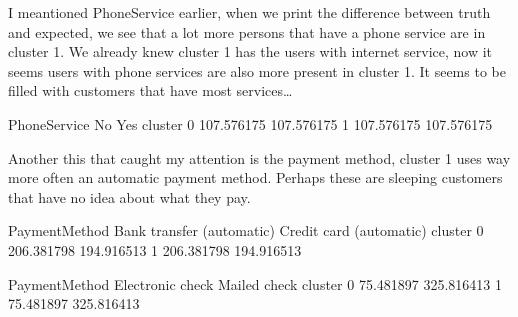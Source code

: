 \documentclass[letterpaper,10pt,english]{jupyterBook}
\begin{document}
\sphinxAtStartPar
I meantioned PhoneService earlier, when we print the difference between truth and expected, we see that a lot more persons that have a phone service are in cluster 1. We already knew cluster 1 has the users with internet service, now it seems users with phone services are also more present in cluster 1. It seems to be filled with customers that have most services…

\begin{sphinxVerbatim}[commandchars=\\\{\}]
\PYG{p}{[}\PYG{p}{]}\PYG{p}{[}\PYG{p}{]}
\end{sphinxVerbatim}

\begin{sphinxVerbatim}[commandchars=\\\{\}]
PhoneService          No         Yes
cluster                             
0             107.576175 \PYGZhy{}107.576175
1            \PYGZhy{}107.576175  107.576175
\end{sphinxVerbatim}

\sphinxAtStartPar
Another this that caught my attention is the payment method, cluster 1 uses way more often an automatic payment method. Perhaps these are sleeping customers that have no idea about what they pay.

\begin{sphinxVerbatim}[commandchars=\\\{\}]
\PYG{p}{[}\PYG{p}{]}\PYG{p}{[}\PYG{p}{]}
\end{sphinxVerbatim}

\begin{sphinxVerbatim}[commandchars=\\\{\}]
PaymentMethod  Bank transfer (automatic)  Credit card (automatic)  \PYGZbs{}
cluster                                                             
0                            \PYGZhy{}206.381798              \PYGZhy{}194.916513   
1                             206.381798               194.916513   

PaymentMethod  Electronic check  Mailed check  
cluster                                        
0                     75.481897    325.816413  
1                    \PYGZhy{}75.481897   \PYGZhy{}325.816413  
\end{sphinxVerbatim}
\end{document}
